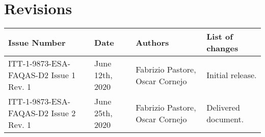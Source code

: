 
\section*{Revisions}
\label{sec:revisions}


\setlength\LTleft{0pt}
\setlength\LTright{0pt}
\tiny 
\begin{longtable}{|p{2cm}|p{1cm}|p{1.5cm}|p{9cm}|@{}}
\label{table:codeoperators} \\
\hline
\textbf{Issue Number}&\textbf{Date}&\textbf{Authors}&\textbf{List of changes}\\
\hline
ITT-1-9873-ESA-FAQAS-D2
Issue 1 Rev. 1&
June 12th, 2020&
Fabrizio Pastore, Oscar Cornejo&
\begin{minipage}{8cm}
Initial release.
\end{minipage}
\\
\hline
ITT-1-9873-ESA-FAQAS-D2
Issue 2 Rev. 1&
June 25th, 2020&
Fabrizio Pastore, Oscar Cornejo&
\begin{minipage}{8cm}
Delivered document.
\end{minipage}
\\
\hline


                                                    
\end{longtable}
\normalsize

\clearpage